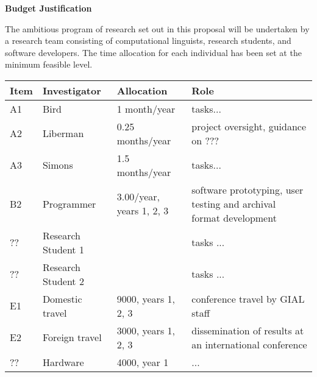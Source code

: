 \documentclass[11pt]{nsf}
\begin{document}
\begin{center}\textbf{\Large
Budget Justification
}\end{center}

The ambitious program of research set out in this proposal will be
undertaken by a research team consisting of computational linguists,
research students, and software developers.  The time allocation for
each individual has been set at the minimum feasible level.

\vspace{1ex}

{\small\noindent
\begin{tabular}{lllp{3in}}
\textbf{Item} &
\textbf{Investigator} & \textbf{Allocation} & \textbf{Role} \\ \hline

A1 & Bird & 1 month/year &
tasks... \\

A2 & Liberman & 0.25 months/year &
project oversight,
guidance on ???\\

A3 & Simons & 1.5 months/year &
tasks... \\

B2 & Programmer & 3.00/year, years 1, 2, 3 &
software prototyping, user testing and archival format development \\

?? & Research Student 1 & &
tasks ... \\

?? & Research Student 2 & &
tasks ... \\

E1 & Domestic travel & 9000, years 1, 2, 3 &
conference travel by GIAL staff \\

E2 & Foreign travel & 3000, years 1, 2, 3 &
dissemination of results at an international conference \\

?? & Hardware & 4000, year 1 &
... \\

\end{tabular}}
\vspace{1ex}


\end{document}
